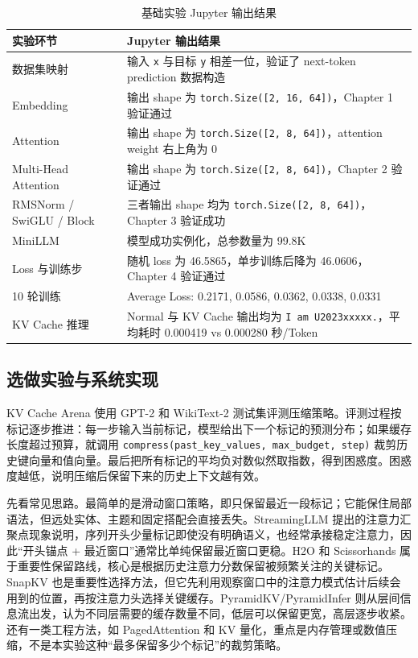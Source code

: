 \documentclass[12pt,a4paper,UTF8]{ctexart}
\newcommand{\xiaosi}{\fontsize{12pt}{18pt}\selectfont}
\newenvironment{reportbody}{\songti\xiaosi\onehalfspacing\sloppy}{}
\begin{document}
\begin{reportbody}
\begin{table}[htbp]
  \caption{基础实验 Jupyter 输出结果}
  \centering
  \begin{tabular}{@{}C{33mm}C{86mm}@{}}
    \toprule
    实验环节 & Jupyter 输出结果 \\
    \midrule
    数据集映射 & 输入 \texttt{x} 与目标 \texttt{y} 相差一位，验证了 next-token prediction 数据构造 \\
    Embedding & 输出 shape 为 \texttt{torch.Size([2, 16, 64])}，Chapter 1 验证通过 \\
    Attention & 输出 shape 为 \texttt{torch.Size([2, 8, 64])}，attention weight 右上角为 0 \\
    Multi-Head Attention & 输出 shape 为 \texttt{torch.Size([2, 8, 64])}，Chapter 2 验证通过 \\
    RMSNorm / SwiGLU / Block & 三者输出 shape 均为 \texttt{torch.Size([2, 8, 64])}，Chapter 3 验证成功 \\
    MiniLLM & 模型成功实例化，总参数量为 99.8K \\
    Loss 与训练步 & 随机 loss 为 46.5865，单步训练后降为 46.0606，Chapter 4 验证通过 \\
    10 轮训练 & Average Loss: 0.2171, 0.0586, 0.0362, 0.0338, 0.0331 \\
    KV Cache 推理 & Normal 与 KV Cache 输出均为 \texttt{I am U2023xxxxx.}，平均耗时 0.000419 vs 0.000280 秒/Token \\
    \bottomrule
  \end{tabular}
\end{table}

\subsection{选做实验与系统实现}
KV Cache Arena 使用 GPT-2 和 WikiText-2 测试集评测压缩策略。评测过程按标记逐步推进：每一步输入当前标记，模型给出下一个标记的预测分布；如果缓存长度超过预算，就调用 \texttt{compress(past\_key\_values, max\_budget, step)} 裁剪历史键向量和值向量。最后把所有标记的平均负对数似然取指数，得到困惑度。困惑度越低，说明压缩后保留下来的历史上下文越有效。

先看常见思路。最简单的是滑动窗口策略，即只保留最近一段标记；它能保住局部语法，但远处实体、主题和固定搭配会直接丢失。StreamingLLM 提出的注意力汇聚点现象说明，序列开头少量标记即使没有明确语义，也经常承接稳定注意力，因此“开头锚点 + 最近窗口”通常比单纯保留最近窗口更稳。H2O 和 Scissorhands 属于重要性保留路线，核心是根据历史注意力分数保留被频繁关注的关键标记。SnapKV 也是重要性选择方法，但它先利用观察窗口中的注意力模式估计后续会用到的位置，再按注意力头选择关键缓存。PyramidKV/PyramidInfer 则从层间信息流出发，认为不同层需要的缓存数量不同，低层可以保留更宽，高层逐步收紧。还有一类工程方法，如 PagedAttention 和 KV 量化，重点是内存管理或数值压缩，不是本实验这种“最多保留多少个标记”的裁剪策略。


\end{reportbody}
\end{document}
